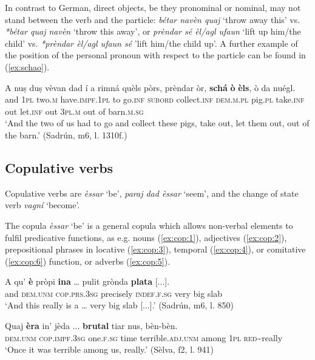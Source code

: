 In contrast to German, direct objects, be they pronominal or nominal, may not stand between the verb and the particle: \textit{bétar navèn quaj} `throw away this' vs. \textit{*bétar quaj navèn} `throw this away', or \textit{prèndar sé èl/agl ufaun} `lift up him/the child' vs. \textit{*prèndar èl/agl ufaun sé} 'lift him/the child up'. A further example of the position of the personal pronoun with respect to the particle can be found in (\ref{ex:schao}).

\ea
\label{ex:schao}
	\gll    A nuṣ duṣ vèvan dad í a rimná quèls pòrs, prèndar òr, \textbf{schá} \textbf{ò} \textbf{èls}, ò da nuégl.\\
	and \textsc{1pl} two.\textsc{m} have.\textsc{impf.1pl} to go.\textsc{inf}  \textsc{subord} collect.\textsc{inf} \textsc{dem.m.pl} pig.\textsc{pl} take.\textsc{inf} out  let.\textsc{inf} out \textsc{3pl.m} out of barn.\textsc{m.sg}\\
\glt `And the two of us had to go and collect these pigs, take out, let them out, out of the barn.' (Sadrún, m6, l. 1310f.)
\z


\subsection{Copulative verbs}
Copulative verbs are \textit{èssar} `be', \textit{paraj dad èssar} `seem', and the change of state verb \textit{vagní} `become'.

The copula \textit{èssar} `be' is a general copula which allows non-verbal elements to fulfil predicative functions, as e.g. nouns (\ref{ex:cop:1}), adjectives (\ref{ex:cop:2}), prepositional phrases in locative (\ref{ex:cop:3}), temporal (\ref{ex:cop:4}), or comitative (\ref{ex:cop:6}) function, or adverbs (\ref{ex:cop:5}).

\ea
\label{ex:cop:1}
	\gll    A qu’ \textbf{è} pròpi \textbf{ina} … pulit grònda \textbf{plata} [...].\\
	and \textsc{dem.unm} \textsc{cop.prs.3sg} precisely \textsc{indef.f.sg} {} very big slab\\
\glt `And this really is a … very big slab [...].' (Sadrún, m6, l. 850)
\z

\ea
\label{ex:cop:2}
\gll Quaj \textbf{èra} in’ jèda ... \textbf{brutal} tiar nus, bèn-bèn.\\
\textsc{dem.unm} \textsc{cop.impf.3sg} one.\textsc{f.sg} time {} terrible.\textsc{adj.unm} among \textsc{1pl} \textsc{red}\textasciitilde{really}\\
\glt `Once it was terrible among us, really.' (Sèlva, f2, l. 941)
\z

